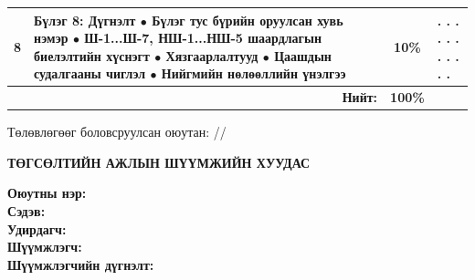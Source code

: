 \begin{titlepage}
\begin{center}
{\begin{tabular}{|c|p{7.8cm}|c|p{2.2cm}|}
8 & \textbf{Бүлэг 8: Дүгнэлт}
\newline $\bullet$ Бүлэг тус бүрийн оруулсан хувь нэмэр
\newline $\bullet$ Ш-1...Ш-7, НШ-1...НШ-5 шаардлагын биелэлтийн хүснэгт
\newline $\bullet$ Хязгаарлалтууд
\newline $\bullet$ Цаашдын судалгааны чиглэл
\newline $\bullet$ Нийгмийн нөлөөллийн үнэлгээ & 10\% & . . . . . . . . . . . \\ \hline
\multicolumn{2}{|r|}{\textbf{Нийт:}} & \textbf{100\%} & \\ \hline
\end{tabular}}

\vspace{1.5cm}
Төлөвлөгөөг боловсруулсан оюутан: \makebox[3cm]{\dotfill} /\shortname/

\end{center}

\newpage


\begin{center}
\textbf{{\large ТӨГСӨЛТИЙН АЖЛЫН ШҮҮМЖИЙН ХУУДАС}}\\[1cm]
\end{center}

\noindent \textbf{Оюутны нэр:} \shortname \\
\noindent \textbf{Сэдэв:} \ttitle \\
\noindent \textbf{Удирдагч:} \supname \\
\noindent \textbf{Шүүмжлэгч:} \readname \\

\vspace{0.5cm}
\noindent \textbf{Шүүмжлэгчийн дүгнэлт:}
\begin{framed}
\vspace{10cm} %
\end{framed}


\end{titlepage}
